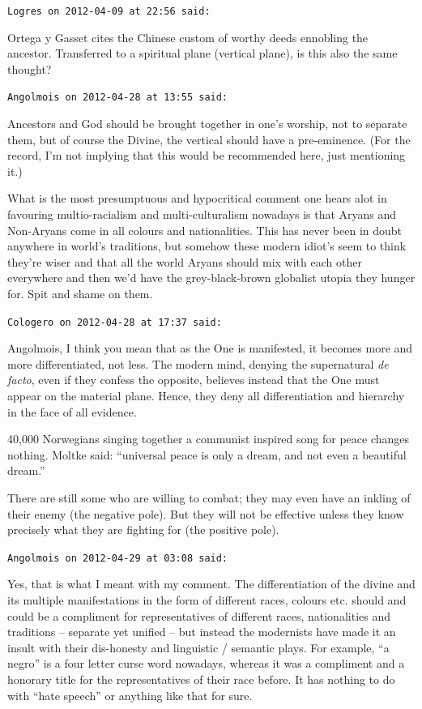\begin{footnotesize}
\begin{sffamily}
\hfill

\texttt{Logres on 2012-04-09 at 22:56 said:}

Ortega y Gasset cites the Chinese custom of worthy deeds ennobling the ancestor. Transferred to a spiritual plane (vertical plane), is this also the same thought?

\hfill

\texttt{Angolmois on 2012-04-28 at 13:55 said:}

Ancestors and God should be brought together in one's worship, not to separate them, but of course the Divine, the vertical should have a pre-eminence. (For the record, I'm not implying that this would be recommended here, just mentioning it.)

What is the most presumptuous and hypocritical comment one hears alot in favouring multio-racialism and multi-culturalism nowadays is that Aryans and Non-Aryans come in all colours and nationalities. This has never been in doubt anywhere in world's traditions, but somehow these modern idiot's seem to think they're wiser and that all the world Aryans should mix with each other everywhere and then we'd have the grey-black-brown globalist utopia they hunger for. Spit and shame on them.

\hfill

\texttt{Cologero on 2012-04-28 at 17:37 said:}

Angolmois, I think you mean that as the One is manifested, it becomes more and more differentiated, not less. The modern mind, denying the supernatural \emph{de facto}, even if they confess the opposite, believes instead that the One must appear on the material plane. Hence, they deny all differentiation and hierarchy in the face of all evidence.

40,000 Norwegians singing together a communist inspired song for peace changes nothing. Moltke said: ``universal peace is only a dream, and not even a beautiful dream.''

There are still some who are willing to combat; they may even have an inkling of their enemy (the negative pole). But they will not be effective unless they know precisely what they are fighting for (the positive pole).

\hfill

\texttt{Angolmois on 2012-04-29 at 03:08 said:}

Yes, that is what I meant with my comment. The differentiation of the divine and its multiple manifestations in the form of different races, colours etc. should and could be a compliment for representatives of different races, nationalities and traditions -- separate yet unified -- but instead the modernists have made it an insult with their dis-honesty and linguistic / semantic plays. For example, ``a negro'' is a four letter curse word nowadays, whereas it was a compliment and a honorary title for the representatives of their race before. It has nothing to do with ``hate speech'' or anything like that for sure.


\end{sffamily}
\end{footnotesize}
